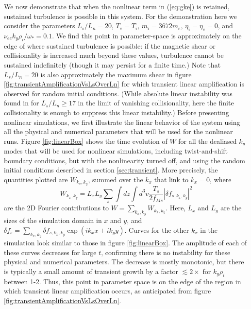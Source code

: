 \documentclass[12pt,superscriptaddress]{revtex4}
\newcommand{\omegase}{\omega_{*}}
\begin{document}
We now demonstrate that when the nonlinear term in (\ref{eq:gke})
is retained, sustained turbulence is possible
in this system.
For the demonstration here we consider
the parameters $L_s/L_n = 20$, $T_e = T_i$, $m_i = 3672 m_e$, $\eta_i = \eta_e = 0$, and $\nu_{ee} k_y \rho_i / \omegase = 0.1$.
We find this point in parameter-space is approximately on the edge of where sustained turbulence
is possible: if the magnetic shear or collisionality is increased much beyond these values,
turbulence cannot be sustained indefinitely (though it may persist for a finite time.)
Note that $L_s/L_n=20$ is also approximately the maximum shear
in figure \ref{fig:transientAmplificationVsLsOverLn} for which transient linear amplification is observed
for random initial conditions.
(While absolute linear instability was found in \cite{usUniversalInstability} for $L_s/L_n \ge 17$ in the limit of vanishing collisionality, here the finite collisionality is enough to suppress this linear instability.)
Before presenting nonlinear simulations,
we first illustrate the linear behavior of the system using all the physical and numerical
parameters that will be used for the nonlinear runs.  Figure \ref{fig:linearBox} shows the time evolution of
$W$ for all the dealiased $k_y$ modes that will be
used for nonlinear simulations, including twist-and-shift boundary conditions,
but with the nonlinearity turned off, and
using the random initial conditions described in section \ref{sec:transient}.
More precisely, the quantities plotted are $W_{k_x,k_y}$, summed over the $k_x$ that link to $k_x=0$, where
\begin{equation}
\label{eq:Wk}
W_{k_x,k_y} = L_x L_y \sum_s \int dz \int d^3v \frac{T_s}{2 f_{Ms}}\left|\delta\! f_{s,k_x,k_y}\right|^2
\end{equation}
are the 2D Fourier contributions to $W = \sum_{k_x,k_y} W_{k_x,k_y}$.
Here,
$L_x$ and $L_y$ are the sizes of the simulation domain in $x$ and $y$,
and $\delta\! f_s =\sum_{k_x,k_y} \delta\! f_{s,k_x,k_y} \exp( i k_x x+i k_y y)$.
Curves for the other $k_x$ in the simulation look similar to those in figure \ref{fig:linearBox}.
The amplitude of each
of these curves decreases for large $t$, confirming there is no instability for these physical and
numerical parameters.  The decrease is mostly monotonic, but there is typically a small
amount of transient growth by a factor $ \lesssim 2\times$ for $k_y \rho_i$ between 1-2.
Thus, this point in parameter space is on the edge of the region in which transient linear
amplification occurs, as anticipated from figure \ref{fig:transientAmplificationVsLsOverLn}.
\end{document}
